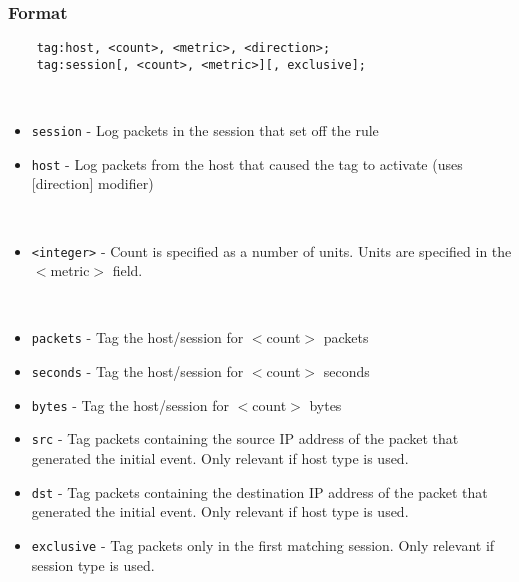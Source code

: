 \documentclass[english]{report}
\begin{document}
\subsubsection{Format}

\begin{verbatim}
    tag:host, <count>, <metric>, <direction>;
    tag:session[, <count>, <metric>][, exclusive];
\end{verbatim}

\begin{description}{}
\item [\texttt{type}]~

\begin{itemize}{}
\item \texttt{session} - Log packets in the session that set off the rule 

\item \texttt{host} - Log packets from the host that caused the tag to activate
(uses {[}direction{]} modifier)

\end{itemize}

\item [\texttt{count}]~
\begin{itemize}{}

\item \texttt{<integer>} - Count is specified as a number of units. Units are
specified in the $<$metric$>$ field.

\end{itemize}{}

\item [\texttt{metric}]~

\begin{itemize}{}
\item \texttt{packets} - Tag the host/session for $<$count$>$ packets 
\item \texttt{seconds} - Tag the host/session for $<$count$>$ seconds
\item \texttt{bytes}   - Tag the host/session for $<$count$>$ bytes
\end{itemize}

\item [\texttt{other}]

\begin{itemize}{}

\item \texttt{src} - Tag packets containing the source IP address of the packet
that generated the initial event.  Only relevant if host type is used.

\item \texttt{dst} - Tag packets containing the destination IP address of the
packet that generated the initial event.  Only relevant if host type is used.

\item \texttt{exclusive} - Tag packets only in the first matching session.
Only relevant if session type is used.

\end{itemize}
\end{description}
\end{document}
